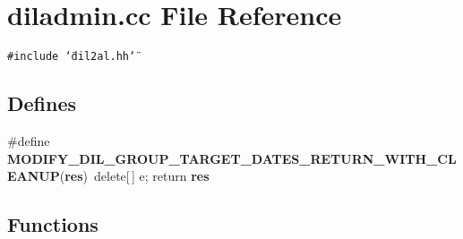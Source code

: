 \section{diladmin.cc File Reference}
\label{diladmin_8cc}
{\tt \#include \char`\"{}dil2al.hh\char`\"{}}\par
\subsection*{Defines}
\begin{CompactItemize}
\item 
\#define {\bf MODIFY\_\-DIL\_\-GROUP\_\-TARGET\_\-DATES\_\-RETURN\_\-WITH\_\-CLEANUP}({\bf res})\ delete[$\,$] e; return {\bf res}
\end{CompactItemize}
\subsection*{Functions}
